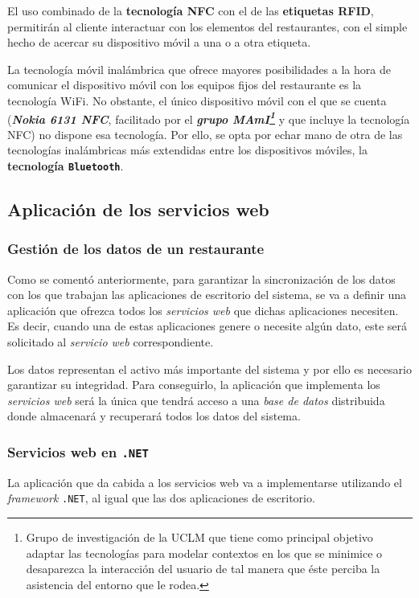   El uso combinado de la \textbf{tecnología \acs{NFC}} con el de las
  \textbf{etiquetas \acs{RFID}}, permitirán al cliente interactuar con los
  elementos del restaurantes, con el simple hecho de acercar su dispositivo
  móvil a una o a otra etiqueta.

  La tecnología móvil inalámbrica que ofrece mayores posibilidades a la hora
  de comunicar el dispositivo móvil con los equipos fijos del restaurante es
  la tecnología \acs{WiFi}. No obstante, el único dispositivo móvil con el que
  se cuenta (\emph{\textbf{Nokia 6131 \acs{NFC}}}, facilitado por el
  \textbf{\emph{grupo \acs{MAmI}\footnote{Grupo de investigación de la
  \acs{UCLM} que tiene como principal objetivo adaptar las tecnologías para 
  modelar contextos en los que se minimice o desaparezca la interacción del 
  usuario de tal manera que éste perciba la asistencia del entorno que le 
  rodea.}}} y que incluye la tecnología \acs{NFC}) no
  dispone esa tecnología. Por ello, se opta por echar mano de otra de las
  tecnologías inalámbricas más extendidas entre los dispositivos móviles, la
  \textbf{tecnología \texttt{Bluetooth}}.

  \subsection{Aplicación de los servicios web}
  \label{subsec:webServicesApp}
    \subsubsection{Gestión de los datos de un restaurante}
  Como se comentó anteriormente, para garantizar la sincronización de los
datos con los que trabajan las aplicaciones de escritorio del sistema, se va a
definir una aplicación que ofrezca todos los \emph{servicios web} que dichas
aplicaciones necesiten. Es decir, cuando una de estas aplicaciones genere o
necesite algún dato, este será solicitado al \emph{servicio web}
correspondiente.

  Los datos representan el activo más importante del sistema y por ello es
necesario garantizar su integridad. Para conseguirlo, la aplicación que
implementa los \emph{servicios web} será la única que tendrá acceso a una
\emph{base de datos} distribuida donde almacenará y recuperará todos los
datos del sistema.

    \subsubsection{Servicios web en \texttt{.NET}}
La aplicación que da cabida a los servicios web va a implementarse utilizando
el \emph{framework} \texttt{.NET}, al igual que las dos aplicaciones de
escritorio.


